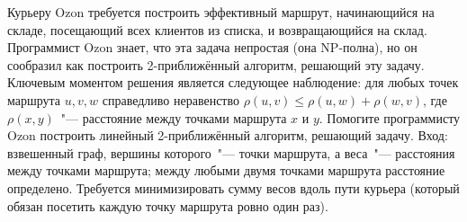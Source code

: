\documentclass[12pt]{extreport}
\theoremstyle{definiton}
\theoremstyle{definition}
\theoremstyle{definition}
\let\leq\leqslant
\begin{document}
	\Pr[6] Курьеру Ozon требуется построить эффективный маршрут, начинающийся на складе, посещающий всех клиентов из списка, и возвращающийся на склад. Программист Ozon знает, что эта задача непростая (она NP-полна), но он сообразил как построить 2-приближённый алгоритм, решающий эту задачу. Ключевым моментом решения является следующее наблюдение: для любых точек маршрута $u,v,w$ справедливо неравенство  $\rho(u,v) \leq \rho(u,w) + \rho(w,v)$, где $\rho(x,y)$~"--- расстояние между точками маршрута $x$ и $y$. Помогите программисту Ozon построить линейный 2-приближённый алгоритм, решающий задачу. Вход: взвешенный граф, вершины которого~"--- точки маршрута, а веса~"--- расстояния между точками маршрута; между любыми двумя точками маршрута расстояние определено. Требуется минимизировать сумму весов вдоль пути курьера (который обязан посетить каждую точку маршрута ровно один раз).
			
\end{document}
